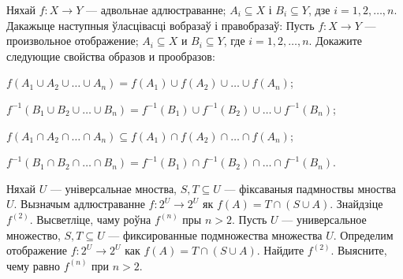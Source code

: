 




\begin{problemList}

\problemItemWithCommonPart
{Няхай $f \colon X \to Y$ --- адвольнае адлюстраванне;
$A_i \subseteq X$ і $B_i \subseteq Y$, дзе $i = 1, 2, \ldots, n$. 
Дакажыце наступныя ўласцівасці вобразаў і правобразаў:}
{Пусть $f \colon X \to Y$ --- произвольное отображение; 
$A_i \subseteq X$ и $B_i \subseteq Y$, где $i = 1, 2, \ldots, n$.
Докажите следующие свойства образов и прообразов:}
{%
\begin{belarusianEnumerate}
	
\item $f(A_1 \cup A_2 \cup \ldots \cup A_n) = f(A_1) \cup f(A_2) \cup \ldots \cup f(A_n)$;

\item $f^{-1}(B_1 \cup B_2 \cup \ldots \cup B_n) = f^{-1}(B_1) \cup f^{-1}(B_2) \cup \ldots \cup f^{-1}(B_n)$;

\item $f(A_1 \cap A_2 \cap \ldots \cap A_n) \subseteq f(A_1) \cap f(A_2) \cap \ldots \cap f(A_n)$;

\item $f^{-1}(B_1 \cap B_2 \cap \ldots \cap B_n) = f^{-1}(B_1) \cap f^{-1}(B_2) \cap \ldots \cap f^{-1}(B_n)$.
	
\end{belarusianEnumerate}
}

\bigskip

\problemItemSimple
{Няхай $U$ --- універсальнае мноства, $S, T \subseteq U$ --- фіксаваныя падмноствы мноства $U$. Вызначым адлюстраванне $f \colon 2^U \to 2^U$ як $f(A) = T \cap (S \cup A)$. Знайдзіце $f^{(2)}$. Высветліце, чаму роўна $f^{(n)}$ пры $n > 2$.}
{Пусть $U$ --- универсальное множество, $S, T \subseteq U$ --- фиксированные подмножества множества $U$. Определим отображение $f \colon 2^U \to 2^U$ как $f(A) = T \cap (S \cup A)$. Найдите $f^{(2)}$. Выясните, чему равно $f^{(n)}$ при $n > 2$.}

\bigskip


\end{problemList}
